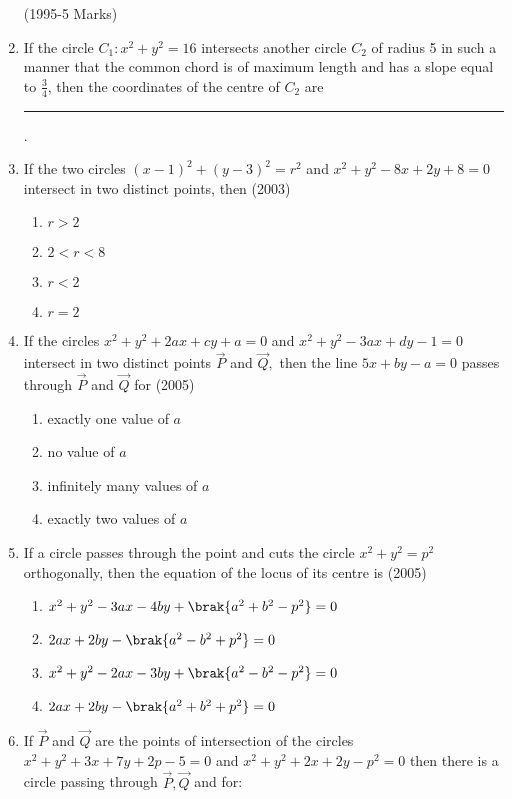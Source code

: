\begin{enumerate}
	      \hfill(1995-5 Marks)
\item If the circle $C_1:x^{2}+y^{2}=16$ intersects another circle $C_2$ of radius 5 in such a manner that the common chord is of maximum length and has a slope equal to $\frac{3}{4}$,  then the coordinates of the centre of $C_2$ are
\rule{1cm}{0.01pt}.
%
	\hfill{}
\item If the two circles $(x-1)^2+(y-3)^2=r^2$ and $x^2+y^2-8x+2y+8=0$ intersect in two distinct points,  then \hfill(2003)
\begin{multicols}{2}
\begin{enumerate}
\item$r>2$
\item$2<r<8$
\item$r<2$
\item$r=2$
\end{enumerate}
\end{multicols}
\item If the circles $x^2+y^2+2ax+cy+a=0$ and $x^2+y^2-3ax+dy-1=0$ intersect in two distinct points $\vec{P}$ and $\vec{Q},$ then the line $5x+by-a=0$ passes through $\vec{P}$ and $\vec{Q}$ for
\hfill{(2005)}
\begin{multicols}{2}
\begin{enumerate}
\item exactly one value of $a$
\item no value of $a$
\item infinitely many values of $a$
\item exactly two values of $a$
\end{enumerate}
\end{multicols}
\item If a circle passes through the point  and cuts the circle $x^2+y^2=p^2$ orthogonally,  then the equation of the locus of its centre is 
\hfill{(2005)}
\begin{multicols}{2}
\begin{enumerate}
\item $x^2+y^2-3ax-4by+\brak{a^2+b^2-p^2}=0$
\item $2ax+2by-\brak{a^2-b^2+p^2}=0$
\item $x^2+y^2-2ax-3by+\brak{a^2-b^2-p^2}=0$
\item $2ax+2by-\brak{a^2+b^2+p^2}=0$
\end{enumerate}
\end{multicols}
\item If $\vec{P}$ and $\vec{Q}$ are the points of intersection of the circles $x^2+y^2+3x+7y+2p-5=0$ and $x^2+y^2+2x+2y-p^2=0$ then there is a circle passing through $\vec{P},  \vec{Q}$ and  for:

\end{enumerate}
